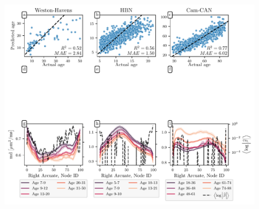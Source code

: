 \documentclass[10pt,%
               aps,%
               prl,%
               preprint,%
               superscriptaddress,%
               preprintnumbers,%
               amsmath,%
               floatfix,%
               endfloats*]{revtex4-1}
\begin{document}
\begin{figure}
    \vspace{3.65cm}
    \vspace{-7.3cm}
    \includegraphics[width=\textwidth]{regression_scatter.pdf}
    {\label{fig:age-results:wh-scatter}}
    {\label{fig:age-results:hbn-scatter}}
    {\label{fig:age-results:cc-scatter}}

\end{figure}
\end{document}
